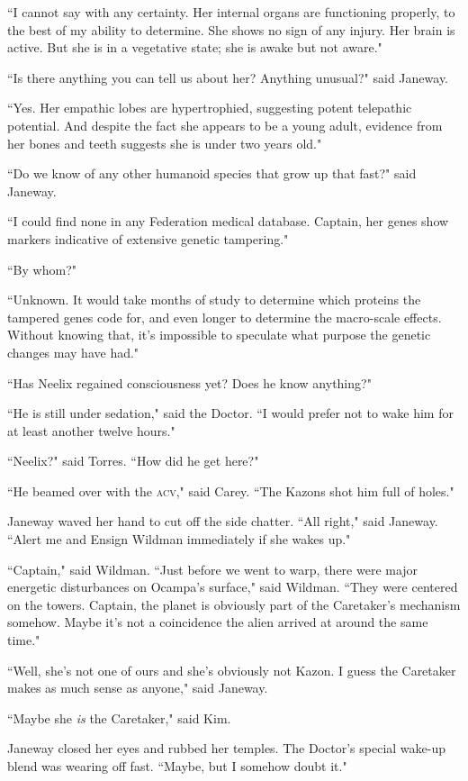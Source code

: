 \documentclass[twoside,letterpaper,12pt]{memoir}
\begin{document}
``I cannot say with any certainty. Her internal organs are functioning properly, to the best of my ability to determine. She shows no sign of any injury. Her brain is active. But she is in a vegetative state; she is awake but not aware." 

``Is there anything you can tell us about her? Anything unusual?" said Janeway. 

``Yes. Her empathic lobes are hypertrophied, suggesting potent telepathic potential. And despite the fact she appears to be a young adult, evidence from her bones and teeth suggests she is under two years old." 

``Do we know of any other humanoid species that grow up that fast?" said Janeway. 

``I could find none in any Federation medical database. Captain, her genes show markers indicative of extensive genetic tampering." 

``By whom?" 

``Unknown. It would take months of study to determine which proteins the tampered genes code for, and even longer to determine the macro-scale effects. Without knowing that, it's impossible to speculate what purpose the genetic changes may have had." 

``Has Neelix regained consciousness yet? Does he know anything?" 

``He is still under sedation," said the Doctor. ``I would prefer not to wake him for at least another twelve hours." 

``Neelix?" said Torres. ``How did he get here?" 

``He beamed over with the \textsc{acv}," said Carey. ``The Kazons shot him full of holes." 

Janeway waved her hand to cut off the side chatter. ``All right," said Janeway. ``Alert me and Ensign Wildman immediately if she wakes up." 

``Captain," said Wildman. ``Just before we went to warp, there were major energetic disturbances on Ocampa's surface," said Wildman. ``They were centered on the towers. Captain, the planet is obviously part of the Caretaker's mechanism somehow. Maybe it's not a coincidence the alien arrived at around the same time." 

``Well, she's not one of ours and she's obviously not Kazon. I guess the Caretaker makes as much sense as anyone," said Janeway. 

``Maybe she \textit{is} the Caretaker," said Kim. 

Janeway closed her eyes and rubbed her temples. The Doctor's special wake-up blend was wearing off fast. ``Maybe, but I somehow doubt it." 
\end{document}
